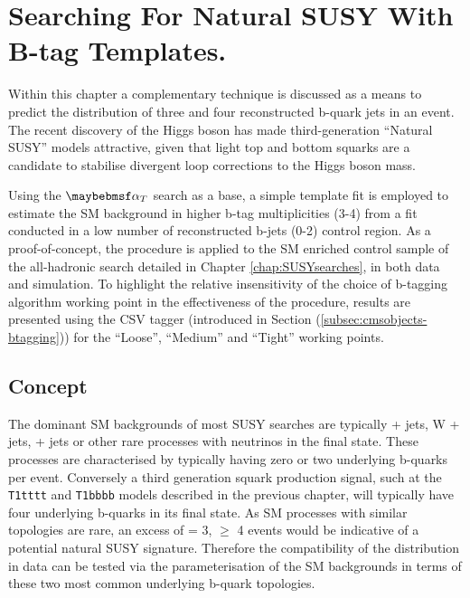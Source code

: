 \chapter{Searching For Natural SUSY With B-tag Templates.}
\label{chap:templatemethod}


Within this chapter a complementary technique is discussed as a means to predict the distribution of three and four reconstructed b-quark jets in an event. The recent discovery of the Higgs boson has made third-generation ``Natural \ac{SUSY}'' models attractive, given that light top and bottom squarks are a candidate to stabilise divergent loop corrections to the Higgs boson mass.

Using the $\alphat$ search as a base, a simple template fit is employed to estimate the \ac{SM} background in higher b-tag multiplicities (3-4) from a fit conducted in a low number of reconstructed b-jets (0-2) control region. As a proof-of-concept, the procedure is applied to the SM enriched \mupjets control sample of the \alphat all-hadronic search detailed in Chapter \ref{chap:SUSYsearches}, in both data and simulation. To highlight the relative insensitivity of the choice of b-tagging algorithm working point in the effectiveness of the procedure, results are presented using the \ac{CSV} tagger (introduced in Section (\ref{subsec:cmsobjects-btagging})) for the ``Loose'', ``Medium'' and ``Tight'' working points.

\section{Concept}
\label{sec:templateconcept}

The dominant \ac{SM} backgrounds of most \ac{SUSY} searches are typically \ttbar + jets, W + jets, \zinv + jets or other rare processes with neutrinos in the final state. These processes are characterised by typically having zero or two underlying b-quarks per event. Conversely a third generation squark production signal, such at the \texttt{T1tttt} and \texttt{T1bbbb} models described in the previous chapter, will typically have four underlying b-quarks in its final state.  As \ac{SM} processes with similar topologies are rare, an excess of \nbreco = 3, $\geq$ 4 events would be indicative of a potential natural \ac{SUSY} signature. Therefore the compatibility of the \nbreco distribution in data can be tested via the parameterisation of the \ac{SM} backgrounds in terms of these two most common underlying b-quark topologies. 

